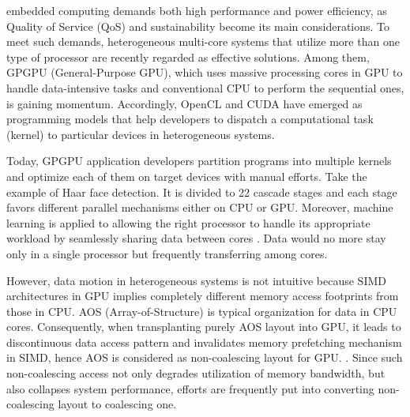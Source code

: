 \documentclass[10pt,journal,compsoc]{IEEEtran}
\begin{document}
%
\IEEEpeerreviewmaketitle



 embedded computing demands both high performance and power efficiency,
as Quality of Service (QoS) and sustainability become its main considerations.
To meet such demands, heterogeneous multi-core systems that utilize more than one
type of processor are recently regarded as effective solutions.
Among them, GPGPU (General-Purpose GPU), which uses massive processing cores in GPU
to handle data-intensive tasks and conventional CPU to perform the sequential ones, is gaining momentum.
Accordingly, OpenCL and CUDA have emerged as programming models that help developers to
dispatch a computational task (kernel) to particular devices in heterogeneous systems.

Today, GPGPU application developers partition programs into multiple
kernels and optimize each of them on target devices with manual efforts.
Take the example of Haar face detection\cite{HAAR}.
It is divided to 22 cascade stages and each stage favors different parallel mechanisms either on CPU or GPU.
Moreover, machine learning is applied to allowing the right processor to handle its appropriate workload by
seamlessly sharing data between cores \cite{partition}. Data would no more stay only in a single processor
but frequently transferring among cores.


However, data motion in heterogeneous systems is not intuitive because
SIMD architectures in GPU implies completely different memory access footprints from those in CPU.
AOS (Array-of-Structure) is typical organization for data
in CPU cores. Consequently, when transplanting purely AOS layout into GPU,
it leads to discontinuous data access pattern and invalidates memory prefetching mechanism in SIMD, hence AOS is considered as non-coalescing layout for GPU.
\cite{CuMAPz}\cite{MemoryThreadLevelParallelism}.
Since such non-coalescing access not only degrades utilization of memory bandwidth, but also collapses system performance, efforts are frequently put into converting non-coalescing layout to coalescing one.
\end{document}
